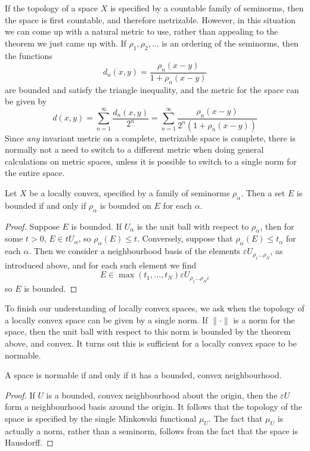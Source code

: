 If the topology of a space $X$ is specified by a countable family of seminorms, then the space is first countable, and therefore metrizable. However, in this situation we can come up with a natural metric to use, rather than appealing to the theorem we just came up with. If $\rho_1, \rho_2, \dots$ is an ordering of the seminorms, then the functions
%
\[ d_n(x,y) = \frac{\rho_n(x - y)}{1 + \rho_n(x-y)} \]
%
are bounded and satisfy the triangle inequality, and the metric for the space can be given by
%
\[ d(x,y) = \sum_{n = 1}^\infty \frac{d_n(x,y)}{2^n} = \sum_{n = 1}^\infty \frac{\rho_n(x-y)}{2^n (1 + \rho_n(x-y))} \]
%
Since {\it any} invariant metric on a complete, metrizable space is complete, there is normally not a need to switch to a different metric when doing general calculations on metric spaces, unless it is possible to switch to a single norm for the entire space.

\begin{theorem}
    Let $X$ be a locally convex, specified by a family of seminorms $\rho_\alpha$. Then a set $E$ is bounded if and only if $\rho_\alpha$ is bounded on $E$ for each $\alpha$.
\end{theorem}
\begin{proof}
    Suppose $E$ is bounded. If $U_\alpha$ is the unit ball with respect to $\rho_\alpha$, then for some $t > 0$, $E \in t U_\alpha$, so $\rho_\alpha(E) \leq t$. Conversely, suppose that $\rho_\alpha(E) \leq t_\alpha$ for each $\alpha$. Then we consider a neighbourhood basis of the elements $\varepsilon U_{\rho_1 \dots \rho_N}$, as introduced above, and for each such element we find
    \[ E \in \max(t_1, \dots, t_N) \varepsilon U_{\rho_1 \dots \rho_N \varepsilon} \]
    so $E$ is bounded.
\end{proof}

To finish our understanding of locally convex spaces, we ask when the topology of a locally convex space can be given by a single norm. If $\| \cdot \|$ is a norm for the space, then the unit ball with respect to this norm is bounded by the theorem above, and convex. It turns out this is sufficient for a locally convex space to be normable.

\begin{theorem}
    A space is normable if and only if it has a bounded, convex neighbourhood.
\end{theorem}
\begin{proof}
    If $U$ is a bounded, convex neighbourhood about the origin, then the $\varepsilon U$ form a neighbourhood basis around the origin. It follows that the topology of the space is specified by the single Minkowski functional $\mu_U$. The fact that $\mu_U$ is actually a norm, rather than a seminorm, follows from the fact that the space is Hausdorff.
\end{proof}

